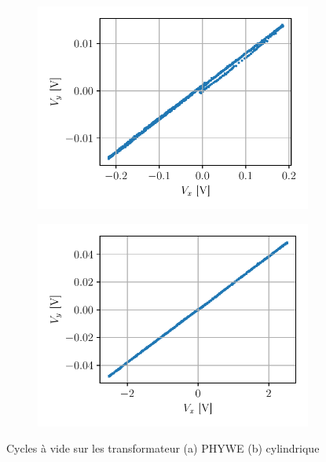\begin{figure}[h]
    \centering
    \begin{subfigure}{0.5\linewidth}
        \centering
        \includegraphics[width=\linewidth]{figures/G1-phywe-vide.pdf}
        \caption{}
        \label{fig:phywe_vide}
    \end{subfigure}%
    \begin{subfigure}{0.5\linewidth}
        \centering
        \includegraphics[width=\linewidth]{figures/G1-cylindre-vide.pdf}
        \caption{}
        \label{fig:cylindre_vide}
    \end{subfigure}
    \caption{Cycles à vide sur les transformateur (a) PHYWE (b) cylindrique}
\end{figure}

